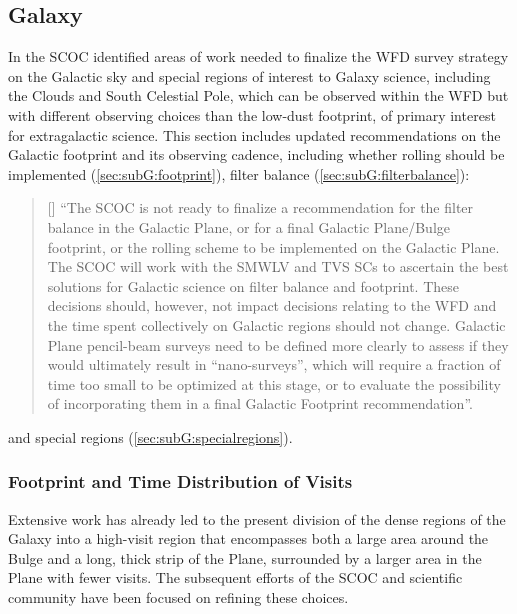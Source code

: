 \subsection{Galaxy}\label{sec:galaxy}
In  the SCOC identified areas of work needed to finalize the WFD survey strategy on the Galactic sky and special regions of interest to Galaxy science, including the Clouds and South Celestial Pole, which can be observed within the WFD but with different observing choices than the low-dust footprint, of primary interest for extragalactic science. This section includes updated recommendations on the Galactic footprint and its observing cadence, including whether rolling should be implemented (\autoref{sec:subG:footprint}), filter balance (\autoref{sec:subG:filterbalance}):
\begin{quote}
    [] ``The SCOC is not ready to finalize a recommendation for the
filter balance in the Galactic Plane, or for a final Galactic Plane/Bulge footprint, or the rolling scheme to be implemented on the Galactic Plane. The SCOC will work with the SMWLV and TVS SCs to ascertain the best solutions for Galactic science on filter balance and footprint. These decisions should, however, not impact decisions relating to the WFD and the time spent collectively on Galactic regions should not change.
Galactic Plane pencil-beam surveys need to be defined more clearly to assess if they would ultimately result in ``nano-surveys'', which will require a fraction of time too small to be optimized at this stage, or to evaluate the possibility of incorporating them in a final Galactic Footprint recommendation''.



\end{quote}and special regions (\autoref{sec:subG:specialregions}).

\subsubsection{Footprint and Time Distribution of Visits}\label{sec:subG:footprint}

Extensive work has already led to the present division of the dense regions of the Galaxy into a high-visit region that encompasses both a large area around the Bulge and a long, thick strip of the Plane, surrounded by a larger area in the Plane with fewer visits. %
The subsequent efforts of the SCOC and scientific community have been focused on refining these choices.


